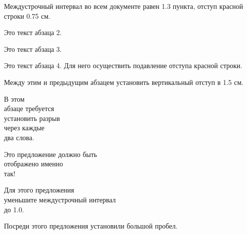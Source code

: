 \documentclass{article}
\begin{document}
    Междустрочный интервал во всем документе равен 1.3 пункта, отступ красной строки 0.75 см.

    Это текст абзаца 2.

    Это текст абзаца 3.

    \noindent Это текст абзаца 4. Для него осуществить подавление отступа красной строки.

    \vspace{1.5cm}
    Между этим и предыдущим абзацем установить вертикальный отступ в 1.5 см.

    В этом\\ абзаце требуется\\ установить разрыв\\ через каждые\\ два слова.
    
    \centering
    Это предложение должно быть\\ отображено именно\\ так!
    
    \vspace{1.5cm}
    Для этого предложения\\ уменьшите междустрочный интервал\\ до 1.0.

    \vspace{1cm}
    Посреди этого предложения\hspace{3cm} установили большой пробел.
\end{document}
